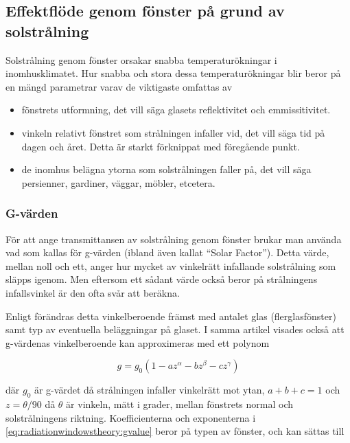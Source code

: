 \subsection{Effektflöde genom fönster på grund av solstrålning}

Solstrålning genom fönster orsakar snabba temperaturökningar i inomhusklimatet. Hur snabba och stora dessa temperaturökningar blir beror på en mängd parametrar varav de viktigaste omfattas av

\begin{itemize}
\item{
fönstrets utformning, det vill säga glasets reflektivitet och emmissitivitet.
}
\item{
vinkeln relativt fönstret som strålningen infaller vid, det vill säga tid på dagen och året. Detta är starkt förknippat med föregående punkt. 
}
\item{
de inomhus belägna ytorna som solstrålningen faller på, det vill säga persienner, gardiner, väggar, möbler, etcetera.
}
\end{itemize} 

\subsubsection{G-värden}

För att ange transmittansen av solstrålning genom fönster brukar man använda vad som kallas för g-värden (ibland även kallat ``Solar Factor''). Detta värde, mellan noll och ett, anger hur mycket av vinkelrätt infallande solstrålning som släpps igenom. Men eftersom ett sådant värde också beror på strålningens infallsvinkel är den ofta svår att beräkna.

Enligt \cite{karlssonroos99} förändras detta vinkelberoende främst med antalet glas (flerglasfönster) samt typ av eventuella beläggningar på glaset. I samma artikel visades också att g-värdenas vinkelberoende kan approximeras med ett polynom

\begin{equation}\label{eq:radiationwindowstheory:gvalue}
g = g_0 \left( 1 - az^{\alpha} - bz^{\beta} - cz^{\gamma} \right)
\end{equation}

där $g_0$ är g-värdet då strålningen infaller vinkelrätt mot ytan, $a+b+c=1$ och $z=\theta/90$ då $\theta$ är vinkeln, mätt i grader, mellan fönstrets normal och solstrålningens riktning. Koefficienterna och exponenterna i \eqref{eq:radiationwindowstheory:gvalue} beror på typen av fönster, och kan sättas till

